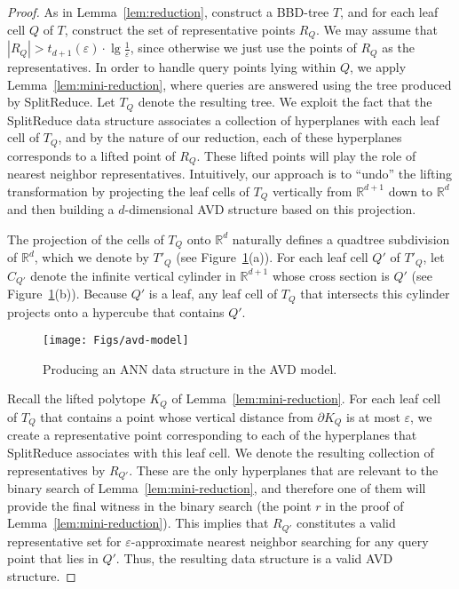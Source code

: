 \documentclass[11pt]{article}   \usepackage[letterpaper,hmargin=2.1cm,vmargin=3cm]{geometry}
\newcommand{\RE}{\mathbb{R}}    \newcommand{\ZZ}{\mathbb{Z}}    \newcommand{\eps}{\varepsilon}  \newcommand{\ST}{\,:\,}         \newcommand{\sq}{\square}
\newcommand{\inv}[1]{\frac{1}{#1}}
\newcommand{\alg}{\textrm{SplitReduce}}
\begin{document}
\begin{proof}
As in Lemma~\ref{lem:reduction}, construct a BBD-tree $T$, and for each leaf cell $Q$ of $T$, construct the set of representative points $R_Q$. We may assume that $|R_Q| > t_{d+1}(\eps) \cdot \lg \inv{\eps}$, since otherwise we just use the points of $R_Q$ as the representatives. In order to handle query points lying within $Q$, we apply Lemma~\ref{lem:mini-reduction}, where queries are answered using the tree produced by {\alg}. Let $T_Q$ denote the resulting tree. We exploit the fact that the {\alg} data structure associates a collection of hyperplanes with each leaf cell of $T_Q$, and by the nature of our reduction, each of these hyperplanes corresponds to a lifted point of $R_Q$. These lifted points will play the role of nearest neighbor representatives. Intuitively, our approach is to ``undo'' the lifting transformation by projecting the leaf cells of $T_Q$ vertically from $\RE^{d+1}$ down to $\RE^d$ and then building a $d$-dimensional AVD structure based on this projection. 

The projection of the cells of $T_Q$ onto $\RE^d$ naturally defines a quadtree subdivision of $\RE^d$, which we denote by $T'_Q$ (see Figure~\ref{fig:avd-model}(a)). For each leaf cell $Q'$ of $T'_Q$, let $C_{Q'}$ denote the infinite vertical cylinder in $\RE^{d+1}$ whose cross section is $Q'$ (see Figure~\ref{fig:avd-model}(b)). Because $Q'$ is a leaf, any leaf cell of $T_Q$ that intersects this cylinder projects onto a hypercube that contains $Q'$. 

\begin{figure}[htbp]
  \centerline{\texttt{[image: Figs/avd-model]}}
  \caption{Producing an ANN data structure in the AVD model.}
  \label{fig:avd-model}
\end{figure}


Recall the lifted polytope $K_Q$ of Lemma~\ref{lem:mini-reduction}. For each leaf cell of $T_Q$ that contains a point whose vertical distance from $\partial K_Q$ is at most $\eps$, we create a representative point corresponding to each of the hyperplanes that {\alg} associates with this leaf cell. We denote the resulting collection of representatives by $R_{Q'}$. These are the only hyperplanes that are relevant to the binary search of Lemma~\ref{lem:mini-reduction}, and therefore one of them will provide the final witness in the binary search (the point $r$ in the proof of Lemma~\ref{lem:mini-reduction}). This implies that $R_{Q'}$ constitutes a valid representative set for $\eps$-approximate nearest neighbor searching for any query point that lies in $Q'$. Thus, the resulting data structure is a valid AVD structure. 


\end{proof}
\end{document}
